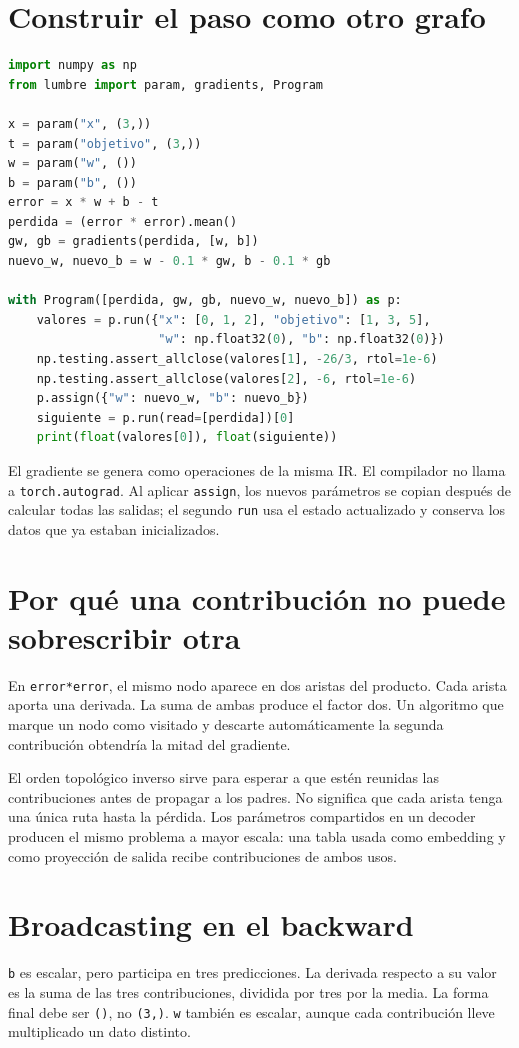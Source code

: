 \documentclass[12pt,a4paper,oneside]{report}
\begin{document}
\section{Construir el paso como otro grafo}
\begin{lstlisting}[language=Python]
import numpy as np
from lumbre import param, gradients, Program

x = param("x", (3,))
t = param("objetivo", (3,))
w = param("w", ())
b = param("b", ())
error = x * w + b - t
perdida = (error * error).mean()
gw, gb = gradients(perdida, [w, b])
nuevo_w, nuevo_b = w - 0.1 * gw, b - 0.1 * gb

with Program([perdida, gw, gb, nuevo_w, nuevo_b]) as p:
    valores = p.run({"x": [0, 1, 2], "objetivo": [1, 3, 5],
                     "w": np.float32(0), "b": np.float32(0)})
    np.testing.assert_allclose(valores[1], -26/3, rtol=1e-6)
    np.testing.assert_allclose(valores[2], -6, rtol=1e-6)
    p.assign({"w": nuevo_w, "b": nuevo_b})
    siguiente = p.run(read=[perdida])[0]
    print(float(valores[0]), float(siguiente))
\end{lstlisting}
El gradiente se genera como operaciones de la misma IR. El compilador no llama a \texttt{torch.autograd}. Al aplicar \texttt{assign}, los nuevos parámetros se copian después de calcular todas las salidas; el segundo \texttt{run} usa el estado actualizado y conserva los datos que ya estaban inicializados.

\section{Por qué una contribución no puede sobrescribir otra}
En \texttt{error*error}, el mismo nodo aparece en dos aristas del producto. Cada arista aporta una derivada. La suma de ambas produce el factor dos. Un algoritmo que marque un nodo como visitado y descarte automáticamente la segunda contribución obtendría la mitad del gradiente.

El orden topológico inverso sirve para esperar a que estén reunidas las contribuciones antes de propagar a los padres. No significa que cada arista tenga una única ruta hasta la pérdida. Los parámetros compartidos en un decoder producen el mismo problema a mayor escala: una tabla usada como embedding y como proyección de salida recibe contribuciones de ambos usos.

\section{Broadcasting en el backward}
\texttt{b} es escalar, pero participa en tres predicciones. La derivada respecto a su valor es la suma de las tres contribuciones, dividida por tres por la media. La forma final debe ser \texttt{()}, no \texttt{(3,)}. \texttt{w} también es escalar, aunque cada contribución lleve multiplicado un dato distinto.
\end{document}
